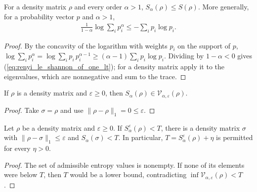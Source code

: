 \begin{theorem}
    \label{thm:renyi_le_von_neumann_of_one_lt}
    \leanok
    For a density matrix $\rho$ and every order $\alpha>1$,
    $S_\alpha(\rho)\le S(\rho)$. More generally, for a probability vector
    $p$ and $\alpha>1$,
    \begin{align}
        \frac1{1-\alpha}\log\sum_ip_i^\alpha\le-\sum_ip_i\log p_i.
        \label{eq:renyi_le_shannon_of_one_lt}
    \end{align}
\end{theorem}
\begin{proof}
    \leanok
    By the concavity of the logarithm with weights $p_i$ on the support of
    $p$,
    $\log\sum_ip_i^\alpha=\log\sum_ip_i\,p_i^{\alpha-1}
        \ge(\alpha-1)\sum_ip_i\log p_i$. Dividing by $1-\alpha<0$ gives
    (\ref{eq:renyi_le_shannon_of_one_lt}); for a density matrix apply it to
    the eigenvalues, which are nonnegative and sum to the trace.
\end{proof}

\begin{theorem}
    \label{thm:renyi_smoothing_self_witness}
    \leanok
    If $\rho$ is a density matrix and $\varepsilon\ge0$, then
    $S_\alpha(\rho)\in\mathcal V_{\alpha,\varepsilon}(\rho)$.
\end{theorem}
\begin{proof}
    \leanok
    Take $\sigma=\rho$ and use $\|\rho-\rho\|_1=0\le\varepsilon$.
\end{proof}

\begin{theorem}
    \label{thm:renyi_smoothing_strict_upper_witness}
    \leanok
    Let $\rho$ be a density matrix and $\varepsilon\ge0$.
    If $S_\alpha^\varepsilon(\rho)<T$, there is a density matrix $\sigma$
    with $\|\rho-\sigma\|_1\le\varepsilon$ and $S_\alpha(\sigma)<T$.
    In particular, $T=S_\alpha^\varepsilon(\rho)+\eta$ is permitted for
    every $\eta>0$.
\end{theorem}
\begin{proof}
    \leanok
    The set of admissible entropy values is nonempty. If none of its
    elements were below $T$, then $T$ would be a lower bound, contradicting
    $\inf\mathcal V_{\alpha,\varepsilon}(\rho)<T$.
\end{proof}
